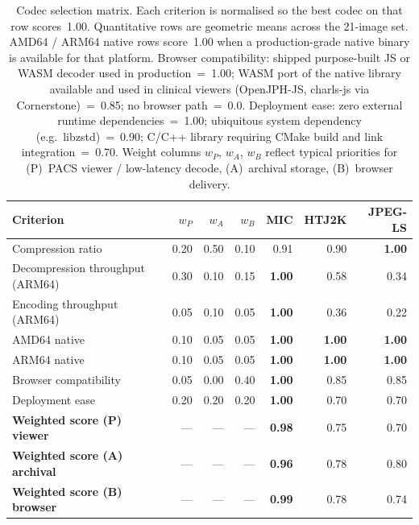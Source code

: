\documentclass[journal]{IEEEtran}
\begin{document}
\begin{table}[t]
\centering
\caption{Codec selection matrix. Each criterion is normalised so the
best codec on that row scores~1.00. Quantitative rows are geometric
means across the 21-image set. AMD64 / ARM64 native rows score~1.00
when a production-grade native binary is available for that platform.
Browser compatibility: shipped purpose-built JS or WASM decoder used in
production~=~1.00; WASM port of the native library available and used in
clinical viewers (OpenJPH-JS, charls-js via Cornerstone)~=~0.85;
no browser path~=~0.0. Deployment ease: zero external runtime
dependencies~=~1.00; ubiquitous system dependency (e.g.\ libzstd)~=~0.90;
C/C++ library requiring CMake build and link integration~=~0.70.
Weight columns $w_P$, $w_A$, $w_B$ reflect typical priorities for
(P)~PACS viewer / low-latency decode, (A)~archival storage,
(B)~browser delivery.}
\label{tab:decision-matrix}
\scriptsize
\setlength{\tabcolsep}{3pt}
\begin{tabular}{lrrrrrr}
\toprule
Criterion & $w_P$ & $w_A$ & $w_B$ & MIC & HTJ2K & JPEG-LS \\
\midrule
Compression ratio                & 0.20 & 0.50 & 0.10 & 0.91 & 0.90 & \textbf{1.00} \\
Decompression throughput (ARM64) & 0.30 & 0.10 & 0.15 & \textbf{1.00} & 0.58 & 0.34 \\
Encoding throughput (ARM64)      & 0.05 & 0.10 & 0.05 & \textbf{1.00} & 0.36 & 0.22 \\
AMD64 native                     & 0.10 & 0.05 & 0.05 & \textbf{1.00} & \textbf{1.00} & \textbf{1.00} \\
ARM64 native                     & 0.10 & 0.05 & 0.05 & \textbf{1.00} & \textbf{1.00} & \textbf{1.00} \\
Browser compatibility            & 0.05 & 0.00 & 0.40 & \textbf{1.00} & 0.85 & 0.85 \\
Deployment ease                  & 0.20 & 0.20 & 0.20 & \textbf{1.00} & 0.70 & 0.70 \\
\midrule
\textbf{Weighted score (P) viewer}   & --- & --- & --- & \textbf{0.98} & 0.75 & 0.70 \\
\textbf{Weighted score (A) archival} & --- & --- & --- & \textbf{0.96} & 0.78 & 0.80 \\
\textbf{Weighted score (B) browser}  & --- & --- & --- & \textbf{0.99} & 0.78 & 0.74 \\
\bottomrule
\end{tabular}
\end{table}
\end{document}
